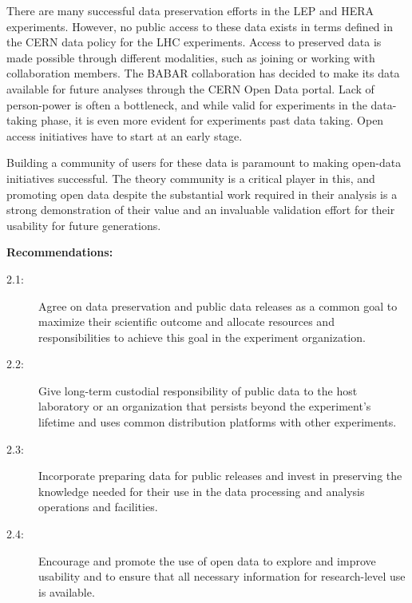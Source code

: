 \documentclass[11pt]{article}
\begin{document}

There are many successful data preservation efforts in the LEP and HERA experiments. However, no public access to these data exists in terms defined in the CERN data policy for the LHC experiments. Access to preserved data is made possible through different modalities, such as joining or working with collaboration members. The BABAR collaboration has decided to make its data available for future analyses through the CERN Open Data portal. Lack of person-power is often a bottleneck, and while valid for experiments in the data-taking phase, it is even more evident for experiments past data taking. Open access initiatives have to start at an early stage.


Building a community of users for these data is paramount to making open-data initiatives successful. The theory community is a critical player in this, and promoting open data despite the substantial work required in their analysis is a strong demonstration of their value and an invaluable validation effort for their usability for future generations.

\noindent
\textbf{Recommendations:}
\begin{description}
   \item[2.1:] Agree on data preservation and public data releases as a common goal to maximize their scientific outcome and allocate resources and responsibilities to achieve this goal in the experiment organization. %
   \item[2.2:] Give long-term custodial responsibility of public data to the host laboratory or an organization that persists beyond the experiment's lifetime and uses common distribution platforms with other experiments.
   \item[2.3:] Incorporate preparing data for public releases and invest in preserving the knowledge needed for their use in the data processing and analysis operations and facilities.
   \item[2.4:] Encourage and promote the use of open data to explore and improve usability and to ensure that all necessary information for research-level use is available.
\end{description}
\end{document}
